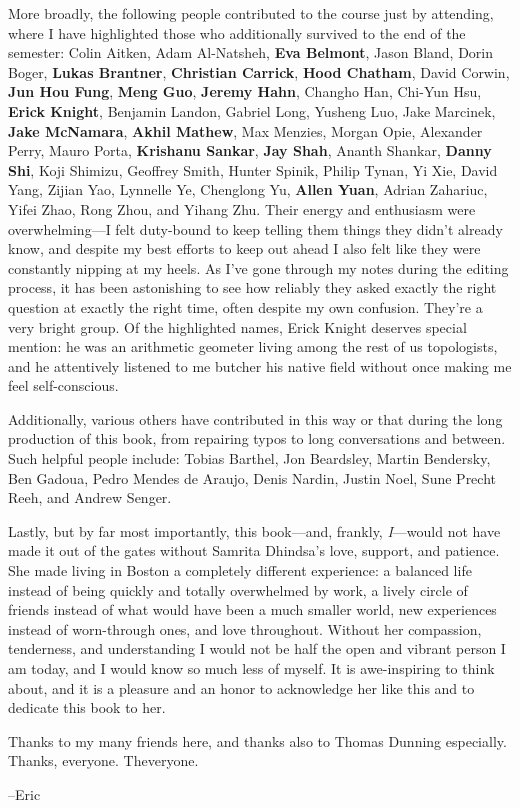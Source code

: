 More broadly, the following people contributed to the course just by attending, where I have highlighted those who additionally survived to the end of the semester: Colin Aitken, Adam Al-Natsheh, \textbf{Eva Belmont}, Jason Bland, Dorin Boger, \textbf{Lukas Brantner}, \textbf{Christian Carrick}, \textbf{Hood Chatham}, David Corwin, \textbf{Jun Hou Fung}, \textbf{Meng Guo}, \textbf{Jeremy Hahn}, Changho Han, Chi-Yun Hsu, \textbf{Erick Knight}, Benjamin Landon, Gabriel Long, Yusheng Luo, Jake Marcinek, \textbf{Jake McNamara}, \textbf{Akhil Mathew}, Max Menzies, Morgan Opie, Alexander Perry, Mauro Porta, \textbf{Krishanu Sankar}, \textbf{Jay Shah}, Ananth Shankar, \textbf{Danny Shi}, Koji Shimizu, Geoffrey Smith, Hunter Spinik, Philip Tynan, Yi Xie, David Yang, Zijian Yao, Lynnelle Ye, Chenglong Yu, \textbf{Allen Yuan}, Adrian Zahariuc, Yifei Zhao, Rong Zhou, and Yihang Zhu.  Their energy and enthusiasm were overwhelming---I felt duty-bound to keep telling them things they didn't already know, and despite my best efforts to keep out ahead I also felt like they were constantly nipping at my heels.  As I've gone through my notes during the editing process, it has been astonishing to see how reliably they asked exactly the right question at exactly the right time, often despite my own confusion.  They're a very bright group.  Of the highlighted names, Erick Knight deserves special mention: he was an arithmetic geometer living among the rest of us topologists, and he attentively listened to me butcher his native field without once making me feel self-conscious.

Additionally, various others have contributed in this way or that during the long production of this book, from repairing typos to long conversations and between.  Such helpful people include: Tobias Barthel, Jon Beardsley, Martin Bendersky, Ben Gadoua, Pedro Mendes de Araujo, Denis Nardin, Justin Noel, Sune Precht Reeh, and Andrew Senger.

Lastly, but by far most importantly, this book---and, frankly, \emph{I}---would not have made it out of the gates without Samrita Dhindsa's love, support, and patience.  She made living in Boston a completely different experience: a balanced life instead of being quickly and totally overwhelmed by work, a lively circle of friends instead of what would have been a much smaller world, new experiences instead of worn-through ones, and love throughout.  Without her compassion, tenderness, and understanding I would not be half the open and vibrant person I am today, and I would know so much less of myself.  It is awe-inspiring to think about, and it is a pleasure and an honor to acknowledge her like this and to dedicate this book to her.

Thanks to my many friends here, and thanks also to Thomas Dunning especially.  Thanks, everyone.  Theveryone.

\vspace{2\baselineskip}
\hspace{3em} --Eric
